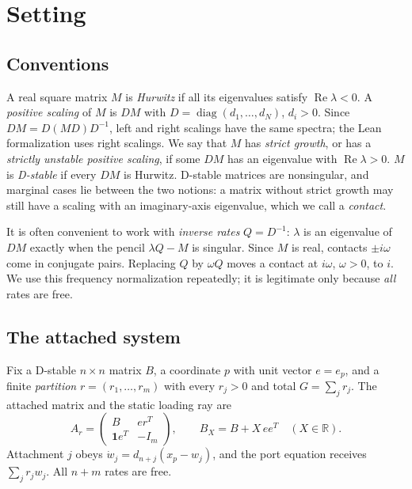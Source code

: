 \documentclass[11pt,a4paper]{article}
\theoremstyle{plain}
\theoremstyle{definition}
\theoremstyle{remark}
\newcommand{\R}{\mathbb{R}}
\newcommand{\Real}{\operatorname{Re}}
\newcommand{\diag}{\operatorname{diag}}
\newcommand{\one}{\mathbf{1}}
\begin{document}
\section{Setting}\label{sec:setting}

\subsection{Conventions}
A real square matrix $M$ is \emph{Hurwitz} if all its eigenvalues satisfy
$\Real\lambda<0$. A \emph{positive scaling} of $M$ is $DM$ with
$D=\diag(d_1,\dots,d_N)$, $d_i>0$. Since $DM=D(MD)D^{-1}$, left and right
scalings have the same spectra; the Lean formalization uses right scalings.
We say that $M$ has \emph{strict growth}, or has a \emph{strictly unstable
positive scaling}, if some $DM$ has an eigenvalue with $\Real\lambda>0$. $M$
is \emph{D-stable} if every $DM$ is Hurwitz. D-stable matrices are
nonsingular, and marginal cases lie between the two notions: a matrix
without strict growth may still have a scaling with an imaginary-axis
eigenvalue, which we call a \emph{contact}.

It is often convenient to work with \emph{inverse rates} $Q=D^{-1}$: $\lambda$
is an eigenvalue of $DM$ exactly when the pencil $\lambda Q-M$ is singular.
Since $M$ is real, contacts $\pm i\omega$ come in conjugate pairs. Replacing
$Q$ by $\omega Q$ moves a contact at $i\omega$, $\omega>0$, to $i$. We use
this frequency normalization repeatedly; it is legitimate only because
\emph{all} rates are free.

\subsection{The attached system}
Fix a D-stable $n\times n$ matrix $B$, a coordinate $p$ with unit vector
$e=e_p$, and a finite \emph{partition} $r=(r_1,\dots,r_m)$ with every
$r_j>0$ and total $G=\sum_jr_j$. The attached matrix and the static loading
ray are
\begin{equation}\label{eq:attached}
 A_r=\begin{pmatrix}B&er^{T}\\ \one e^{T}&-I_m\end{pmatrix},\qquad
 B_X=B+X\,ee^{T}\quad(X\in\R).
\end{equation}
Attachment $j$ obeys $\dot w_j=d_{n+j}(x_p-w_j)$, and the port equation
receives $\sum_jr_jw_j$. All $n+m$ rates are free.
\end{document}
